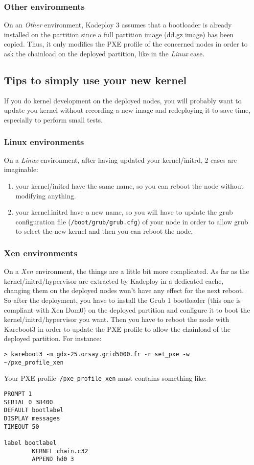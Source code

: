 \documentclass[a4wide,10pt,oneside]{book}
\begin{document}
\subsubsection{Other environments}
On an \emph{Other} environment, Kadeploy 3 assumes that a bootloader is already installed on the partition since a full partition image (dd.gz image) has been copied. Thus, it only modifies the PXE profile of the concerned nodes in order to ask the chainload on the deployed partition, like in the \emph{Linux} case.

\subsection{Tips to simply use your new kernel}
If you do kernel development on the deployed nodes, you will probably want to update you kernel without recording a new image and redeploying it to save time, especially to perform small tests.

\subsubsection{Linux environments}
On a \emph{Linux} environment, after having updated your kernel/initrd, 2 cases are imaginable:
\begin{enumerate}
\item your kernel/initrd have the same name, so you can reboot the node without modifying anything.
\item your kernel.initrd have a new name, so you will have to update the grub configuration file (\texttt{/boot/grub/grub.cfg}) of your node in order to allow grub to select the new kernel and then you can reboot the node.
\end{enumerate}

\subsubsection{Xen environments}
On a \emph{Xen} environment, the things are a little bit more complicated. As far as the kernel/initrd/hypervisor are extracted by Kadeploy in a dedicated cache, changing them on the deployed nodes won't have any effect for the next reboot. So after the deployment, you have to install the Grub 1 bootloader (this one is compliant with Xen Dom0) on the deployed partition and configure it to boot the kernel/initrd/hypervisor you want. Then you have to reboot the node with Kareboot3 in order to update the PXE profile to allow the chainload of the deployed partition. For instance:
\begin{verbatim}
> kareboot3 -m gdx-25.orsay.grid5000.fr -r set_pxe -w ~/pxe_profile_xen
\end{verbatim}
Your PXE profile\texttt{~/pxe\_profile\_xen} must contains something like:
\begin{verbatim}
PROMPT 1
SERIAL 0 38400
DEFAULT bootlabel
DISPLAY messages
TIMEOUT 50

label bootlabel
        KERNEL chain.c32
        APPEND hd0 3
\end{verbatim}
\end{document}
